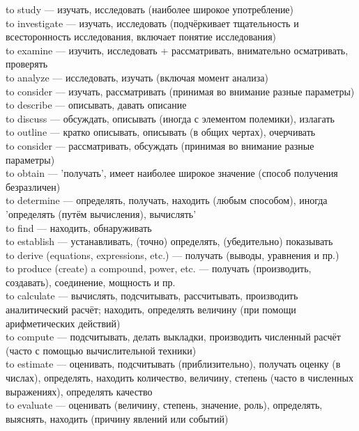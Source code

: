 
\newcommand{\DictWord} [2] {%
	#1 --- #2\\%
}

\newcommand{\Infinitive} {%
	\Italic{Inf}%
}

\newcommand{\Gerund} {%
	\Italic{Ger}%
}

\newcommand{\Noun}  {%
	\Italic{N}%
}

\newcommand{\Adjective} {%
	\Italic{Adj}%
}



\DictWord{to study}
	{изучать, исследовать (наиболее широкое употребление)}
\DictWord{to investigate}
	{изучать, исследовать (подчёркивает тщательность и всесторонность исследования, включает
		понятие исследования)}
\DictWord{to examine}
	{изучить, исследовать + рассматривать, внимательно осматривать, проверять}
\DictWord{to analyze}
	{исследовать, изучать (включая момент анализа)}
\DictWord{to consider}
	{изучать, рассматривать (принимая во внимание разные параметры)}

\DictWord{to describe}
	{описывать, давать описание}
\DictWord{to discuss}
	{обсуждать, описывать (иногда с элементом полемики), излагать}
\DictWord{to outline}
	{кратко описывать, описывать (в общих чертах), очерчивать}
\DictWord{to consider}
	{рассматривать, обсуждать (принимая во внимание разные параметры)}

\DictWord{to obtain}
	{'получать', имеет наиболее широкое значение (способ получения безразличен)}
\DictWord{to determine}
	{определять, получать, находить (любым способом), иногда 'определять (путём вычисления), 
		вычислять'}
\DictWord{to find}
	{находить, обнаруживать}
\DictWord{to establish}
	{устанавливать, (точно) определять, (убедительно) показывать}

\DictWord{to derive (equations, expressions, etc.)}
	{получать (выводы, уравнения и пр.)}
\DictWord{to produce (create) a compound, power, etc.}
	{получать (производить, создавать), соединение, мощность и пр.}

\DictWord{to calculate}
	{вычислять, подсчитывать, рассчитывать, производить аналитический расчёт; находить, определять 
		величину (при помощи арифметических действий)}
\DictWord{to compute}
	{подсчитывать, делать выкладки, производить численный расчёт (часто с помощью вычислительной 
		техники)}
\DictWord{to estimate}
	{оценивать, подсчитывать (приблизительно), получать оценку (в числах), определять, находить 
		количество, величину, степень (часто в численных выражениях), определять качество}
\DictWord{to evaluate}
	{оценивать (величину, степень, значение, роль), определять, выяснять, находить (причину явлений 
		или событий)}

